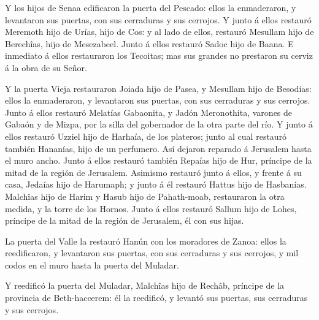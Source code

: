  Y los hijos de Senaa edificaron la puerta del Pescado:
ellos la enmaderaron, y levantaron sus puertas, con sus cerraduras y sus
cerrojos.  Y junto á ellos restauró Meremoth hijo de Urías,
hijo de Cos: y al lado de ellos, restauró Mesullam hijo de Berechîas,
hijo de Mesezabeel. Junto á ellos restauró Sadoc hijo de Baana.
 E inmediato á ellos restauraron los Tecoitas; mas sus
grandes no prestaron su cerviz á la obra de su Señor.

 Y la puerta Vieja restauraron Joiada hijo de Pasea, y
Mesullam hijo de Besodías: ellos la enmaderaron, y levantaron sus
puertas, con sus cerraduras y sus cerrojos.  Junto á ellos
restauró Melatías Gabaonita, y Jadón Meronothita, varones de Gabaón y de
Mizpa, por la silla del gobernador de la otra parte del río.
 Y junto á ellos restauró Uzziel hijo de Harhaía, de los
plateros; junto al cual restauró también Hananías, hijo de un perfumero.
Así dejaron reparado á Jerusalem hasta el muro ancho.  Junto
á ellos restauró también Repaías hijo de Hur, príncipe de la mitad de la
región de Jerusalem.  Asimismo restauró junto á ellos, y
frente á su casa, Jedaías hijo de Harumaph; y junto á él restauró Hattus
hijo de Hasbanías.  Malchîas hijo de Harim y Hasub hijo de
Pahath-moab, restauraron la otra medida, y la torre de los Hornos.
 Junto á ellos restauró Sallum hijo de Lohes, príncipe de
la mitad de la región de Jerusalem, él con sus hijas.

 La puerta del Valle la restauró Hanún con los moradores de
Zanoa: ellos la reedificaron, y levantaron sus puertas, con sus
cerraduras y sus cerrojos, y mil codos en el muro hasta la puerta del
Muladar.

 Y reedificó la puerta del Muladar, Malchîas hijo de
Rechâb, príncipe de la provincia de Beth-haccerem: él la reedificó, y
levantó sus puertas, sus cerraduras y sus cerrojos.

